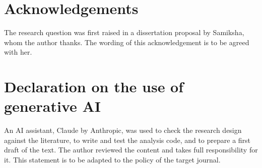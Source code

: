 \documentclass[12pt,a4paper]{article}
\begin{document}
\section*{Acknowledgements}

The research question was first raised in a dissertation proposal by Samiksha, whom the author thanks. The wording of this acknowledgement is to be agreed with her.

\section*{Declaration on the use of generative AI}

An AI assistant, Claude by Anthropic, was used to check the research design against the literature, to write and test the analysis code, and to prepare a first draft of the text. The author reviewed the content and takes full responsibility for it. This statement is to be adapted to the policy of the target journal.
\end{document}
